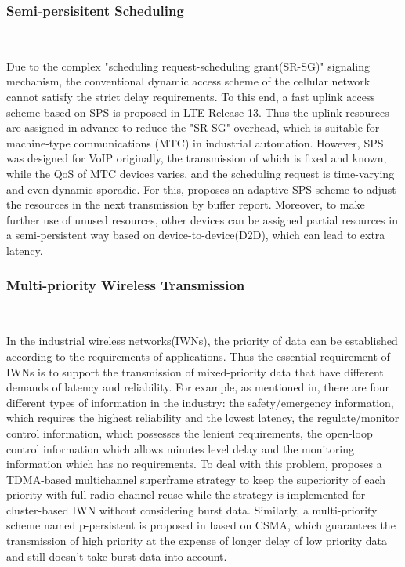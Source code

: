 \documentclass{SCIS2021}
\begin{document}
	\subsubsection{Semi-persisitent Scheduling}~{}
	
	Due to the complex "scheduling request-scheduling grant(SR-SG)" signaling mechanism, the conventional dynamic access scheme of the cellular network cannot satisfy the strict delay requirements\cite{holfeld2016wireless}. To this end, a fast uplink access scheme based on SPS is proposed in LTE Release 13\cite{3gpp2010}. Thus the uplink resources are assigned in advance to reduce the "SR-SG" overhead, which is suitable for machine-type communications (MTC) in industrial automation\cite{schulz2017latency}. However, SPS was designed for VoIP originally, the transmission of which is fixed and known, while the QoS of MTC devices varies, and the scheduling request is time-varying and even dynamic sporadic\cite{seo2012performance}. For this, \cite{afrin2015design} proposes an adaptive SPS scheme to adjust the resources in the next transmission by buffer report. Moreover, to make further use of unused resources, other devices can be assigned partial resources in a semi-persistent way based on device-to-device(D2D), which can lead to extra latency\cite{soleymani2016hierarchical}.
	
	\subsubsection{Multi-priority Wireless Transmission}~{}
	
	
	In the industrial wireless networks(IWNs), the priority of data can be established according to the requirements of applications\cite{raza2018novel}. Thus the essential requirement of IWNs is to support the transmission of mixed-priority data that have different demands of latency and reliability\cite{farag2018priority,gaj2012computer}. For example, as mentioned in\cite{zand2012wireless}, there are four different types of information in the industry: the safety/emergency information, which requires the highest reliability and the lowest latency, the regulate/monitor control information, which possesses the lenient requirements, the open-loop control information which allows minutes level delay and the monitoring information which has no requirements. To deal with this problem, \cite{lin2019framework} proposes a TDMA-based multichannel superframe strategy to keep the superiority of each priority with full radio channel reuse while the strategy is implemented for cluster-based IWN without considering burst data. Similarly, a multi-priority scheme named p-persistent is proposed in\cite{hang2020delay} based on CSMA, which guarantees the transmission of high priority at the expense of longer delay of low priority data and still doesn't take burst data into account.
	
\end{document}
